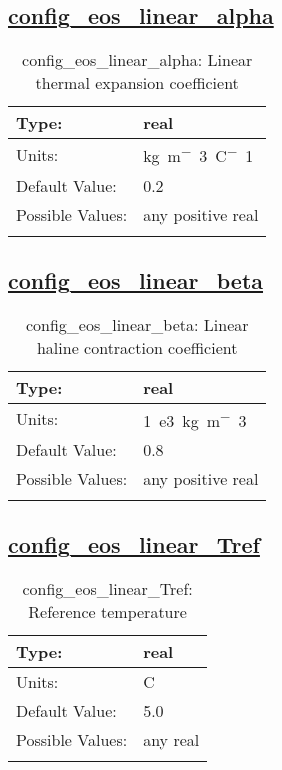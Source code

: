 \subsection[config\_eos\_linear\_alpha]{\hyperref[sec:nm_tab_eos_linear]{config\_eos\_linear\_alpha}}
\label{subsec:nm_sec_config_eos_linear_alpha}
\begin{center}
\begin{longtable}{| p{2.0in} || p{4.0in} |}
    \hline
    Type: & real \\
    \hline
    Units: & \si{kg.m^-3.C^-1} \\
    \hline
    Default Value: & 0.2 \\
    \hline
    Possible Values: & any positive real \\
    \hline
    \caption{config\_eos\_linear\_alpha: Linear thermal expansion coefficient}
\end{longtable}
\end{center}
\subsection[config\_eos\_linear\_beta]{\hyperref[sec:nm_tab_eos_linear]{config\_eos\_linear\_beta}}
\label{subsec:nm_sec_config_eos_linear_beta}
\begin{center}
\begin{longtable}{| p{2.0in} || p{4.0in} |}
    \hline
    Type: & real \\
    \hline
    Units: & \si{1.e3.kg.m^-3} \\
    \hline
    Default Value: & 0.8 \\
    \hline
    Possible Values: & any positive real \\
    \hline
    \caption{config\_eos\_linear\_beta: Linear haline contraction coefficient}
\end{longtable}
\end{center}
\subsection[config\_eos\_linear\_Tref]{\hyperref[sec:nm_tab_eos_linear]{config\_eos\_linear\_Tref}}
\label{subsec:nm_sec_config_eos_linear_Tref}
\begin{center}
\begin{longtable}{| p{2.0in} || p{4.0in} |}
    \hline
    Type: & real \\
    \hline
    Units: & \si{C} \\
    \hline
    Default Value: & 5.0 \\
    \hline
    Possible Values: & any real \\
    \hline
    \caption{config\_eos\_linear\_Tref: Reference temperature}
\end{longtable}
\end{center}
